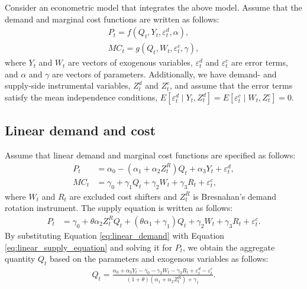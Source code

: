 \documentclass[11pt, a4paper]{article}
\begin{document}
Consider an econometric model that integrates the above model.
Assume that the demand and marginal cost functions are written as follows: 
\begin{align}
    P_t = f(Q_{t}, Y_t, \varepsilon^{d}_{t}, \alpha), \label{eq:demand}\\
    MC_t = g(Q_{t}, W_{t}, \varepsilon^{c}_{t}, \gamma),\label{eq:marginal_cost}
\end{align}
where $Y_t$ and $W_{t}$ are vectors of exogenous variables, $\varepsilon^{d}_{t}$ and $\varepsilon^{c}_{t}$ are error terms, and $\alpha$ and $\gamma$ are vectors of parameters.
Additionally, we have demand- and supply-side instrumental variables, $Z^{d}_{t}$ and $Z^{c}_{t}$, and assume that the error terms satisfy the mean independence conditions, $E[\varepsilon^{d}_{t}\mid Y_t, Z^{d}_{t}] = E[\varepsilon^{c}_{t} \mid W_{t}, Z^{c}_{t}] =0$.

\subsection{Linear demand and cost}
Assume that linear demand and marginal cost functions are specified as follows:
\begin{align}
    P_t &= \alpha_0 - (\alpha_1 + \alpha_2Z^{R}_{t})Q_{t} + \alpha_3 Y_t + \varepsilon^{d}_{t},\label{eq:linear_demand}\\
    MC_t &= \gamma_0  + \gamma_1 Q_{t} + \gamma_2 W_{t} + \gamma_3 R_{t} + \varepsilon^{c}_{t},\label{eq:linear_marginal_cost}
\end{align}
where $W_{t}$ and $R_{t}$ are excluded cost shifters and $Z^{R}_{t}$ is Bresnahan's demand rotation instrument. 
The supply equation is written as follows:
\begin{align}
    P_t 
    &= \gamma_0 + \theta \alpha_2 Z^{R}_tQ_{t} + (\theta\alpha_1 + \gamma_1) Q_{t} + \gamma_2 W_t + \gamma_3 R_{t} +\varepsilon^c_t.\label{eq:linear_supply_equation}
\end{align}
By substituting Equation \eqref{eq:linear_demand} with Equation \eqref{eq:linear_supply_equation} and solving it for $P_t$, we obtain the aggregate quantity $Q_{t}$ based on the parameters and exogenous variables as follows:
\begin{align}
    Q_{t} =  \frac{\alpha_0 + \alpha_3 Y_t - \gamma_0 - \gamma_2 W_{t} - \gamma_3 R_{t} + \varepsilon^{d}_{t} - \varepsilon^{c}_{t}}{(1 + \theta) (\alpha_1 + \alpha_2 Z^{R}_{t}) + \gamma_1}.\label{eq:quantity_linear}
\end{align}
\end{document}
